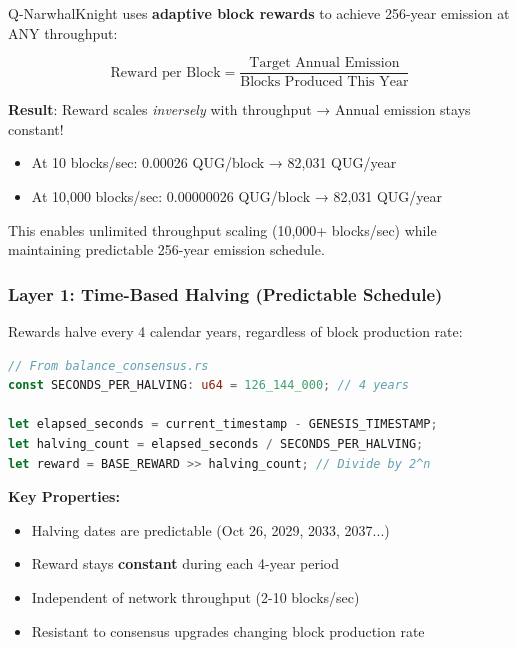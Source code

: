 \documentclass[11pt,a4paper]{article}
\begin{document}
\begin{tcolorbox}[colback=primarycolor!10, colframe=primarycolor, title=Core Innovation: Throughput-Independent Emission]
Q-NarwhalKnight uses \textbf{adaptive block rewards} to achieve 256-year emission at ANY throughput:

\begin{equation}
\text{Reward per Block} = \frac{\text{Target Annual Emission}}{\text{Blocks Produced This Year}}
\end{equation}

\textbf{Result}: Reward scales \textit{inversely} with throughput → Annual emission stays constant!

\begin{itemize}
    \item At 10 blocks/sec: 0.00026 QUG/block → 82,031 QUG/year
    \item At 10,000 blocks/sec: 0.00000026 QUG/block → 82,031 QUG/year
\end{itemize}

This enables unlimited throughput scaling (10,000+ blocks/sec) while maintaining predictable 256-year emission schedule.
\end{tcolorbox}

\subsubsection{Layer 1: Time-Based Halving (Predictable Schedule)}

Rewards halve every 4 calendar years, regardless of block production rate:

\begin{lstlisting}[language=Rust]
// From balance_consensus.rs
const SECONDS_PER_HALVING: u64 = 126_144_000; // 4 years

let elapsed_seconds = current_timestamp - GENESIS_TIMESTAMP;
let halving_count = elapsed_seconds / SECONDS_PER_HALVING;
let reward = BASE_REWARD >> halving_count; // Divide by 2^n
\end{lstlisting}

\textbf{Key Properties:}
\begin{itemize}
    \item Halving dates are predictable (Oct 26, 2029, 2033, 2037...)
    \item Reward stays \textbf{constant} during each 4-year period
    \item Independent of network throughput (2-10 blocks/sec)
    \item Resistant to consensus upgrades changing block production rate
\end{itemize}
\end{document}
